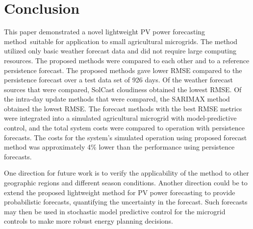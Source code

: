 \section{Conclusion}
\label{sec:conclusion}

This paper demonstrated a novel lightweight PV power forecasting method\ suitable for application to small agricultural microgrids.
The method utilized only basic weather forecast data and did not require large computing resources.
The proposed methods were compared to each other and to a reference persistence forecast.
The proposed methods gave lower RMSE compared to the persistence forecast
over a test data set of
926 days.
Of the weather forecast sources that were compared,
SolCast cloudiness
obtained the lowest RMSE.
Of the intra-day update methods that were compared,
the SARIMAX method
obtained the lowest RMSE.
The forecast methods with the best RMSE metrics were integrated into a simulated
agricultural microgrid with model-predictive control,
and the total system costs were compared to operation with persistence forecasts.
The costs for the system's simulated operation using proposed forecast method was approximately
4\% lower than the performance using persistence forecasts.

One direction for future work is to verify the applicability of the method to other geographic regions and different season conditions.
Another direction could be to extend the proposed lightweight method for PV power forecasting to provide probabilistic forecasts, quantifying the uncertainty in the forecast.
Such forecasts may then be used in stochastic model predictive control for the microgrid controls to make more robust energy planning decisions.
